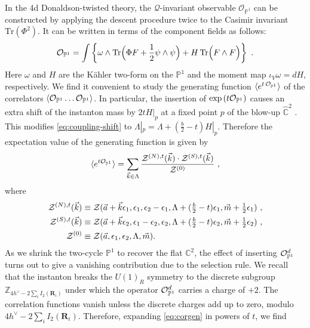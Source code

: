\documentclass[letterpaper, 11pt]{article}
\def\IC{\mathbb{C}}
\def\IP{\mathbb{P}}
\def\IZ{\mathbb{Z}}
\def\CO{{\cal O}}
\def\CZ{{\cal Z}}
\def\e{\epsilon}
\def\half{\frac{1}{2}}
\begin{document}
In the 4d Donaldson-twisted theory, the $\mathcal{Q}$-invariant observable $\mathcal{O}_{\IP^1}$ can be constructed by applying the descent procedure twice to the Casimir invariant $\text{Tr}(\Phi^2)$. It can be written in terms of the component fields as follows: \cite{Witten:1988ze}
\begin{align} \label{eq:muC}
  {\CO}_{\IP^1} = \int \left\{ \omega \wedge \text{Tr}\Big(\Phi F + \half \psi \wedge \psi\Big) + H\, \text{Tr}\Big( F \wedge F \Big) \right\}  \ .
\end{align} 
Here $\omega$ and $H$ are the K\"ahler two-form on the $\IP^1$ and the moment map $\iota_V \omega = dH$, respectively.
We find it convenient to study the generating function $\langle e^{t \, {\CO}_{\IP^1}}\rangle $ of the correlators $\langle {\CO}_{\IP^1} \ldots {\CO}_{\IP^1} \rangle$. 
In particular, the insertion of $\exp{(t  {\CO}_{\IP^1})}$ causes an extra shift of the instanton mass by $2tH|_p$ at a fixed point $p$ of the blow-up $\hat{\IC}^2$ \cite{Nakajima:2003pg,Nakajima:2003uh, Nakajima:2005fg}. This modifies \eqref{eq:coupling-shift} to $\Lambda|_p = \Lambda + (\frac{b}{2}-t)H|_p$.
Therefore the expectation value of the generating function is given by
\begin{align}
  \label{eq:corgen}
  \langle e^{t  {\CO}_{\IP^1}}\rangle = \sum_{\vec{k} \in \Lambda}  \frac{\CZ^{(N),t}(\vec{k}) \cdot \CZ^{(S),t}(\vec{k})}{\CZ^{(0)}}\ , 
\end{align} 
where
\begin{align}
  \label{eq:param-np-sp}
\begin{split}
  \CZ^{(N),t}(\vec{k}) &\equiv \CZ(\vec{a}+\vec{k} \e_1, \e_1, \e_2-\e_1, \Lambda +  (\tfrac{b}{2}-t)\e_1, \vec{m} +\tfrac{1}{2}\e_1) \ , \\
  \CZ^{(S),t}(\vec{k}) &\equiv \CZ(\vec{a}+\vec{k} \e_2, \e_1 - \e_2, \e_2, \Lambda +  (\tfrac{b}{2}-t)\e_2, \vec{m} +\tfrac{1}{2}\e_2)\ , \\
 \CZ^{(0)} &\equiv \CZ(\vec{a}, \e_1, \e_2, \Lambda, \vec{m}).
\end{split}
\end{align}
As we shrink the two-cycle $\IP^1$ to recover the flat $\IC^2$, the effect of  inserting ${\CO}_{\IP^1}^d$ turns out to give a vanishing contribution due to the selection rule. We recall that the instanton breaks the $U(1)_R$ symmetry 
to the discrete subgroup $\IZ_{4h^\vee - 2\sum_i I_2(\mathbf{R}_i)}$ under which the operator ${\CO}_{\IP^1}^d$ carries a charge of $+2$. The correlation functions vanish unless the discrete charges add up to zero, modulo $4h^\vee - 2\sum_i I_2(\mathbf{R}_i)$. Therefore, expanding \eqref{eq:corgen} in powers of $t$, we find
\end{document}
